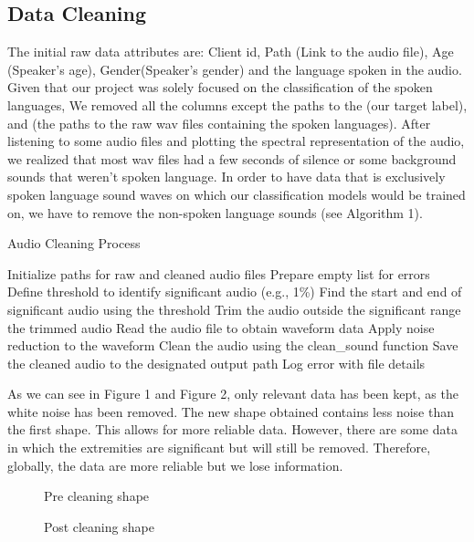 \documentclass[twocolumn]{article}
\begin{document}
\subsection{Data Cleaning}
The initial raw data attributes are: Client id, Path (Link to the audio file), Age (Speaker's age), Gender(Speaker's gender) and the language spoken in the audio.\\

Given that our project was solely focused on the classification of the spoken languages, We removed all the columns except the paths to the  (our target label), and  (the paths to the raw wav files containing the spoken languages). After listening to some audio files and plotting the spectral representation of the audio, we realized that most wav files had a few seconds of silence or some background sounds that weren't spoken language. In order to have data that is exclusively spoken language sound waves on which our classification models would be trained on, we have to remove the non-spoken language sounds (see Algorithm 1).  
\begin{algorithm}
\caption{Audio Cleaning Process}
\begin{algorithmic}[1]
\State Initialize paths for raw and cleaned audio files
\State Prepare empty list for errors
    \State Define threshold to identify significant audio (e.g., 1\%)
    \State Find the start and end of significant audio using the threshold
    \State Trim the audio outside the significant range
    \State \Return the trimmed audio
\EndFunction
{}
        \State Read the audio file to obtain waveform data
        \State Apply noise reduction to the waveform
        \Try
            \State Clean the audio using the clean\_sound function
            \State Save the cleaned audio to the designated output path
        \Except
            \State Log error with file details
        \EndTry
\end{algorithmic}
\end{algorithm}

As we can see in Figure 1 and Figure 2, only relevant data has been kept, as the white noise has been removed. The new shape obtained contains less noise than the first shape. This allows for more reliable data. However, there are some data in which the extremities are significant but will still be removed. Therefore, globally, the data are more reliable but we lose information.\\
\begin{figure}[!tbp]
  \centering
  \begin{minipage}[b]{0.4\textwidth}
    
    \caption{Pre cleaning shape}
  \end{minipage}
  \hfill
  \begin{minipage}[b]{0.4\textwidth}
    
    \caption{Post cleaning shape}
  \end{minipage}
\end{figure}
\end{document}
